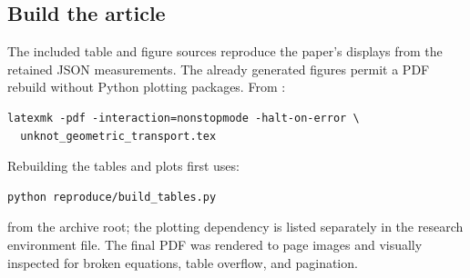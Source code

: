 \subsection{Build the article}

The included table and figure sources reproduce the paper's displays from
the retained JSON measurements. The already generated figures permit a
PDF rebuild without Python plotting packages. From :
\begin{lstlisting}
latexmk -pdf -interaction=nonstopmode -halt-on-error \
  unknot_geometric_transport.tex
\end{lstlisting}
Rebuilding the tables and plots first uses:
\begin{lstlisting}
python reproduce/build_tables.py
\end{lstlisting}
from the archive root; the plotting dependency is listed separately in the
research environment file. The final PDF was rendered to page images and
visually inspected for broken equations, table overflow, and pagination.
